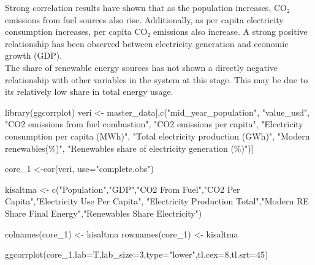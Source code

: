\documentclass[
  letterpaper,
  DIV=11,
  numbers=noendperiod]{scrartcl}
\newenvironment{Shaded}{\begin{snugshade}}{\end{snugshade}}
\newcommand{\AttributeTok}[1]{\textcolor[rgb]{0.40,0.45,0.13}{#1}}
\newcommand{\DecValTok}[1]{\textcolor[rgb]{0.68,0.00,0.00}{#1}}
\newcommand{\FunctionTok}[1]{\textcolor[rgb]{0.28,0.35,0.67}{#1}}
\newcommand{\NormalTok}[1]{\textcolor[rgb]{0.00,0.23,0.31}{#1}}
\newcommand{\OtherTok}[1]{\textcolor[rgb]{0.00,0.23,0.31}{#1}}
\newcommand{\StringTok}[1]{\textcolor[rgb]{0.13,0.47,0.30}{#1}}
\begin{document}
Strong correlation results have shown that as the population increases,
CO₂ emissions from fuel sources also rise. Additionally, as per capita
electricity consumption increases, per capita CO₂ emissions also
increase. A strong positive relationship has been observed between
electricity generation and economic growth (GDP).\\
The share of renewable energy sources has not shown a directly negative
relationship with other variables in the system at this stage. This may
be due to its relatively low share in total energy usage.

\begin{Shaded}
\begin{Highlighting}[]
\FunctionTok{library}\NormalTok{(ggcorrplot)}
\NormalTok{veri }\OtherTok{\textless{}{-}}\NormalTok{ master\_data[,}\FunctionTok{c}\NormalTok{(}\StringTok{"mid\_year\_population"}\NormalTok{,}
                      \StringTok{"value\_usd"}\NormalTok{,}
                      \StringTok{"CO2 emissions from fuel combustion"}\NormalTok{,}
                      \StringTok{"CO2 emissions per capita"}\NormalTok{,}
                      \StringTok{"Electricity consumption per capita (MWh)"}\NormalTok{,}
                      \StringTok{"Total electricity production (GWh)"}\NormalTok{,}
                      \StringTok{"Modern renewables(\%)"}\NormalTok{,}
                      \StringTok{"Renewables share of electricity generation (\%)"}\NormalTok{)] }

\NormalTok{core\_1 }\OtherTok{\textless{}{-}}\FunctionTok{cor}\NormalTok{(veri, }\AttributeTok{use=}\StringTok{"complete.obs"}\NormalTok{)}



\NormalTok{kisaltma }\OtherTok{\textless{}{-}} \FunctionTok{c}\NormalTok{(}\StringTok{"Population"}\NormalTok{,}\StringTok{"GDP"}\NormalTok{,}\StringTok{"CO2 From Fuel"}\NormalTok{,}\StringTok{"CO2 Per Capita"}\NormalTok{,}\StringTok{"Electricity Use Per Capita"}\NormalTok{, }\StringTok{"Electricity Production Total"}\NormalTok{,}\StringTok{"Modern RE Share Final Energy"}\NormalTok{,}\StringTok{"Renewables Share Electricity"}\NormalTok{)}

\FunctionTok{colnames}\NormalTok{(core\_1) }\OtherTok{\textless{}{-}}\NormalTok{ kisaltma}
\FunctionTok{rownames}\NormalTok{(core\_1) }\OtherTok{\textless{}{-}}\NormalTok{ kisaltma}

\FunctionTok{ggcorrplot}\NormalTok{(core\_1,}\AttributeTok{lab=}\NormalTok{T,}\AttributeTok{lab\_size=}\DecValTok{3}\NormalTok{,}\AttributeTok{type=}\StringTok{"lower"}\NormalTok{,}\AttributeTok{tl.cex=}\DecValTok{8}\NormalTok{,}\AttributeTok{tl.srt=}\DecValTok{45}\NormalTok{) }
\end{Highlighting}
\end{Shaded}
\end{document}
